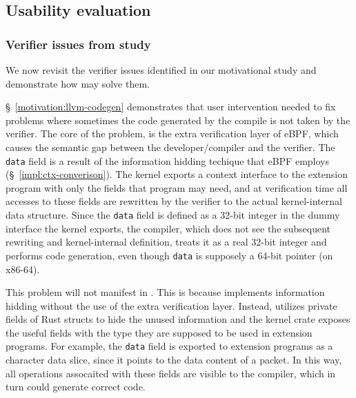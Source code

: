 \subsection{Usability evaluation}

\subsubsection{Verifier issues from study}
We now revisit the verifier issues identified in our motivational study and
    demonstrate how \projname{} may solve them.

 \S~\ref{motivation:llvm-codegen} demonstrates that
    user intervention needed to fix problems where sometimes the code generated
    by the compile is not taken by the verifier.
The core of the problem, is the extra verification layer of eBPF, which causes
    the semantic gap between the developer/compiler and the verifier.
The \texttt{data} field is a result of the information hidding techique that
    eBPF employs (\S~\ref{impl:ctx-converison}).
The kernel exports a context interface to the extension program with only
    the fields that program may need, and at verification time all accesses to
    these fields are rewritten by the verifier to the actual kernel-internal
    data structure.
Since the \texttt{data} field is defined as a 32-bit integer in the dummy
    interface the kernel exports, the compiler, which does not see the
    subsequent rewriting and kernel-internal definition, treats it as a real
    32-bit integer and performs code generation, even though \texttt{data} is
    supposely a 64-bit pointer (on x86-64).

This problem will not manifest in \projname{}.
This is because \projname{} implements information hidding without the use of
    the extra verification layer.
Instead, \projname{} utilizes private fields of Rust structs to hide the unused
    information and the kernel crate exposes the useful fields with the type
    they are supposed to be used in extension programs.
For example, the \texttt{data} field is exported to extension programs as a
    character data slice, since it points to the data content of a packet.
In this way, all operations assocaited with these fields are visible to the
    compiler, which in turn could generate correct code.

